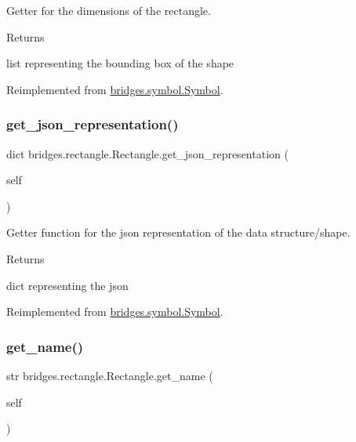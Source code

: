 Getter for the dimensions of the rectangle. 

\begin{DoxyReturn}{Returns}


list representing the bounding box of the shape 
\end{DoxyReturn}


Reimplemented from \mbox{\hyperlink{classbridges_1_1symbol_1_1_symbol_a18aa1240a141ec2621322e37471eae30}{bridges.\+symbol.\+Symbol}}.

\mbox{\label{classbridges_1_1rectangle_1_1_rectangle_a5ead80ed6cd7d287e3884e8792b51b40}} 
\subsubsection{\texorpdfstring{get\_json\_representation()}{get\_json\_representation()}}
{\footnotesize\ttfamily  dict bridges.\+rectangle.\+Rectangle.\+get\+\_\+json\+\_\+representation (\begin{DoxyParamCaption}\item[{}]{self }\end{DoxyParamCaption})}



Getter function for the json representation of the data structure/shape. 

\begin{DoxyReturn}{Returns}


dict representing the json 
\end{DoxyReturn}


Reimplemented from \mbox{\hyperlink{classbridges_1_1symbol_1_1_symbol_a891a710ff160439aa6dc476ce057f22e}{bridges.\+symbol.\+Symbol}}.

\mbox{\label{classbridges_1_1rectangle_1_1_rectangle_a1de16beb003cfd25e5357116bbc4dc78}} 
\subsubsection{\texorpdfstring{get\_name()}{get\_name()}}
{\footnotesize\ttfamily  str bridges.\+rectangle.\+Rectangle.\+get\+\_\+name (\begin{DoxyParamCaption}\item[{}]{self }\end{DoxyParamCaption})}



